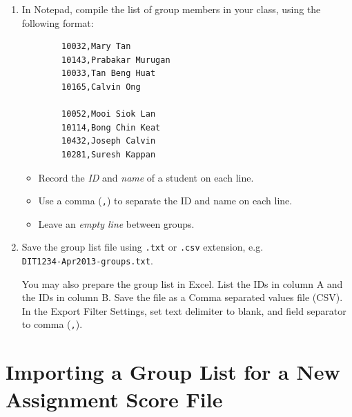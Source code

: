 \documentclass[a4paper,11pt]{refart}
\begin{document}
	
	\begin{enumerate}
		\item In Notepad, compile the list of group members in your class, using the following format:
		
		\begin{lstlisting}
		10032,Mary Tan
		10143,Prabakar Murugan
		10033,Tan Beng Huat
		10165,Calvin Ong
		
		10052,Mooi Siok Lan
		10114,Bong Chin Keat
		10432,Joseph Calvin
		10281,Suresh Kappan
		\end{lstlisting}
		
		\begin{itemize}[noitemsep]
			\item Record the \emph{ID} and \emph{name} of a student on each line.
			\item Use a comma (\texttt{,}) to separate the ID and name on each line.
			\item Leave an \emph{empty line} between groups.
		\end{itemize}
		
		\item Save the group list file using \texttt{.txt} or \texttt{.csv} extension, e.g.\\\texttt{DIT1234-Apr2013-groups.txt}.
		
		\medskip
		
		\begin{leftbar}
			You may also prepare the group list in Excel. List the IDs in column A and the IDs in column B. Save the file as a Comma separated values file (CSV). In the Export Filter Settings, set text delimiter to blank, and field separator to comma (\texttt{,}).
		\end{leftbar}
		
	\end{enumerate}
	
	\section{Importing a Group List for a New Assignment Score File}
	
\end{document}
